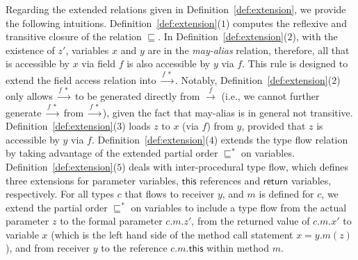 \documentclass{fac}
\newcommand\ie{\textit{i.e.\ }}
\newcommand{\keyword}[1]{\mathsf{#1}}
\newcommand{\less}{\sqsubseteq}
\newcommand{\tflow}{\dashrightarrow}
\newcommand{\hflow}{\longrightarrow}
\newcommand{\lhflow}[1]{\stackrel{#1}{\hflow}}
\begin{document}
Regarding the extended relations given in Definition~\ref{def:extension}, we provide the following intuitions. Definition~\ref{def:extension}($1$)  computes the reflexive and transitive closure of the relation $\less$.
In Definition~\ref{def:extension}($2$), with the existence of $z'$, variables $x$ and $y$ are in the \emph{may-alias} relation, therefore, all that is accessible by $x$ via field $f$ is also accessible by $y$ via $f$. This rule is designed to extend the field access relation into $\lhflow{f\ *}$. Notably, Definition~\ref{def:extension}($2$) only allows $\lhflow{f\ *}$ to be generated directly from $\lhflow{f}$ (i.e., we cannot further generate $\lhflow{f\ *}$ from $\lhflow{f\ *}$), given the fact that may-alias is in general not transitive.
Definition~\ref{def:extension}($3$) loads $z$ to $x$ (via $f$) from $y$, provided that $z$ is accessible by $y$ via $f$.
Definition~\ref{def:extension}($4$) extends the type flow relation by taking advantage of the extended partial order $\less^*$ on variables.
Definition~\ref{def:extension}($5$) deals with inter-procedural type flow, which defines three extensions for parameter variables, $\keyword{this}$ references and $\keyword{return}$ variables, respectively.
For all types $c$ that flows to receiver $y$, and $m$ is defined for $c$, we extend the partial order $\less^*$ on variables to include a type flow from the actual parameter $z$ to the formal parameter $c.m.z'$, from the returned value of $c.m.x'$ to variable $x$ (which is the left hand side of the method call statement $x=y.m(z)$), and from receiver $y$ to the reference $c.m.\keyword{this}$ within method $m$.

\end{document}

